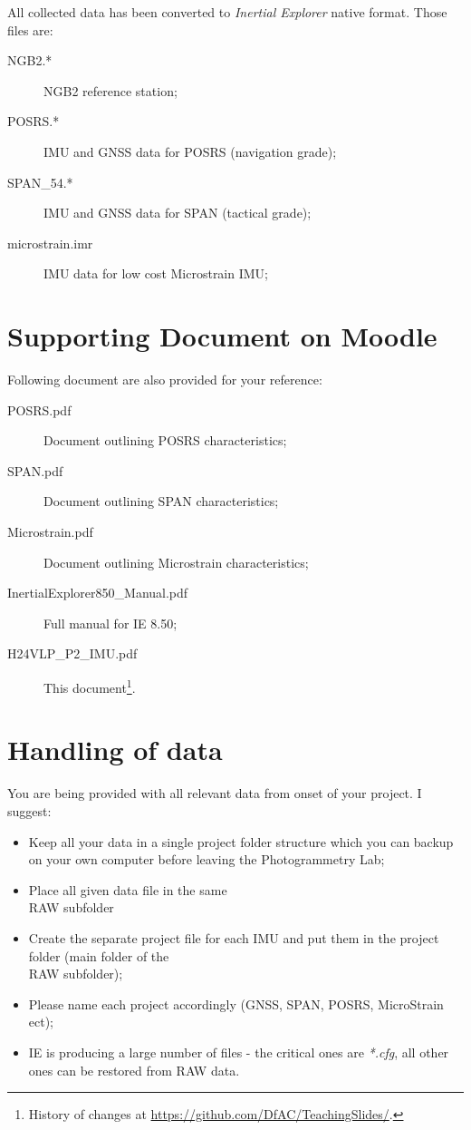 \documentclass[11pt,fleqn]{book} %
\newcommand{\thisDocRef}{\footnote{History of changes at \url{https://github.com/DfAC/TeachingSlides/}.}}
\begin{document}
All collected data has been converted to \emph{Inertial Explorer} native format. Those files are:
	\begin{description}
	\item [{NGB2.{*}}] NGB2 reference station;
	\item [{POSRS.{*}}] IMU and GNSS data for POSRS (navigation grade);
	\item [{SPAN\_54.{*}}] IMU and GNSS data for SPAN (tactical grade);
	\item [{microstrain.imr}] IMU data for low cost Microstrain IMU;
	\end{description}


\section{Supporting Document on Moodle}

Following document are also provided for your reference:

	\begin{description}
	\item [{POSRS.pdf}] Document outlining POSRS characteristics;
	\item [{SPAN.pdf}] Document outlining SPAN characteristics;
	\item [{Microstrain.pdf}] Document outlining Microstrain characteristics;
	\item [{InertialExplorer850\_Manual.pdf}] Full manual for IE 8.50;
	\item [{H24VLP\_P2\_IMU.pdf}] This document\thisDocRef.
	\end{description}

\section{Handling of data}

You are being provided with all relevant data from onset of your project. I suggest:

\begin{itemize}
	\item Keep all your data in a single project folder structure which you can backup on your own computer before leaving the Photogrammetry Lab;
	\item Place all given data file in the same  \\RAW subfolder
	\item Create the separate project file for each IMU and put them in the project folder (main folder of the \\RAW subfolder);
	\item Please name each project accordingly (GNSS, SPAN, POSRS, MicroStrain ect); 
	\item IE is producing a large number of files - the critical ones are \textit{*.cfg}, all other ones can be restored from RAW data.
\end{itemize}
\end{document}
